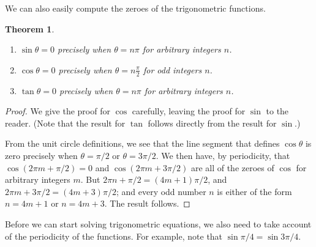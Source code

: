 \documentclass[a4paper,leqno]{article}
\numberwithin{equation}{section}
\newtheorem{thm}[equation]{Theorem}
\theoremstyle{definition}
\theoremstyle{remark}
\begin{document}
We can also easily compute the zeroes of the trigonometric functions.
\begin{thm}\leavevmode
  \begin{enumerate}
    \item $ \sin \theta = 0 $ precisely when $ \theta = n \pi $ for arbitrary integers $ n $.
    \item $ \cos \theta = 0 $ precisely when $ \theta = n \frac{\pi}{2} $ for odd integers $ n $.
    \item $ \tan \theta = 0 $ precisely when $ \theta = n\pi $ for arbitrary integers $ n $.
  \end{enumerate}
\end{thm}
\begin{proof}
  We give the proof for $ \cos $ carefully, leaving the proof for $ \sin $ to the reader. (Note that the result for $ \tan $ follows
  directly from the result for $ \sin $.)

  From the unit circle definitions, we see that the line segment that defines $ \cos \theta $ is zero precisely when $ \theta = \pi/2 $
  or $ \theta = 3\pi/2 $. We then have, by periodicity, that $ \cos (2\pi m + \pi/2) = 0 $ and $ \cos(2\pi m + 3\pi/2) $ are all of the
  zeroes of $ \cos $ for arbitrary integers $ m $. But $ 2\pi n + \pi/2 = (4m + 1) \pi/2 $, and $ 2\pi m + 3\pi/2 = (4m + 3) \pi/2 $; and every odd number $ n $ is
  either of the form $ n = 4m + 1 $ or $ n = 4m + 3 $. The result follows.
\end{proof}

Before we can start solving trigonometric equations, we also need to take account of the periodicity of the functions. For
example, note that $ \sin \pi/4 = \sin 3\pi/4 $.
\end{document}
